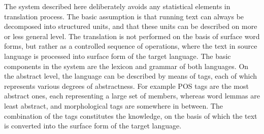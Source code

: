 The system described here deliberately avoids any statistical elements in translation process. The basic assumption is that running text can always be decomposed into structured units, and that these units can be described on more or less general level. The translation is not performed on the basis of surface word forms, but rather as a controlled sequence of operations, where the text in source language is processed into surface form of the target language. The basic components in the system are the lexicon and grammar of both languages. On the abstract level, the language can be described by means of tags, each of which represents various degrees of abstractness. For example POS tags are the most abstract ones, each representing a large set of members, whereas word lemmas are least abstract, and morphological tags are somewhere in between. The combination of the tags constitutes the knowledge, on the basis of which the text is converted into the surface form of the target language.
